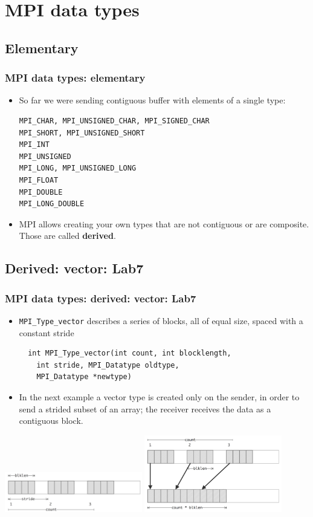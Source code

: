 \documentclass{beamer}
\begin{document}
\section{MPI data types}
\subsection{Elementary}
\begin{frame}[fragile]
  \frametitle{MPI data types: elementary}
\begin{itemize}
\item So far we were sending contiguous buffer with elements of a single type:
{\color{mycolorcode}
\begin{verbatim}
MPI_CHAR, MPI_UNSIGNED_CHAR, MPI_SIGNED_CHAR
MPI_SHORT, MPI_UNSIGNED_SHORT
MPI_INT
MPI_UNSIGNED
MPI_LONG, MPI_UNSIGNED_LONG
MPI_FLOAT
MPI_DOUBLE
MPI_LONG_DOUBLE
\end{verbatim}
}
\item MPI allows creating your own types that are not contiguous or are composite. Those are called {\color{mycolordef}\textbf{derived}}.
\end{itemize}
\end{frame}

\subsection{Derived: vector: Lab7}
\begin{frame}[fragile]
  \frametitle{MPI data types: derived: vector: Lab7}
  \begin{itemize}
  \item {\color{mycolorcode}\verb|MPI_Type_vector|} describes a series of blocks, all of equal size, spaced with a constant stride
{\color{mycolorcode}
\begin{verbatim}
  int MPI_Type_vector(int count, int blocklength, 
    int stride, MPI_Datatype oldtype, 
    MPI_Datatype *newtype)
\end{verbatim}
}
\item In the next example a vector type is created only on the sender, in order to send a strided subset of an array; the
  receiver receives the data as a contiguous block.
\end{itemize}
\begin{multicols}{2}
\includegraphics[width=6.0cm]{graphs/vector.png}
\includegraphics[width=6.0cm]{graphs/vector1.png}
\end{multicols}
\end{frame}
\end{document}
